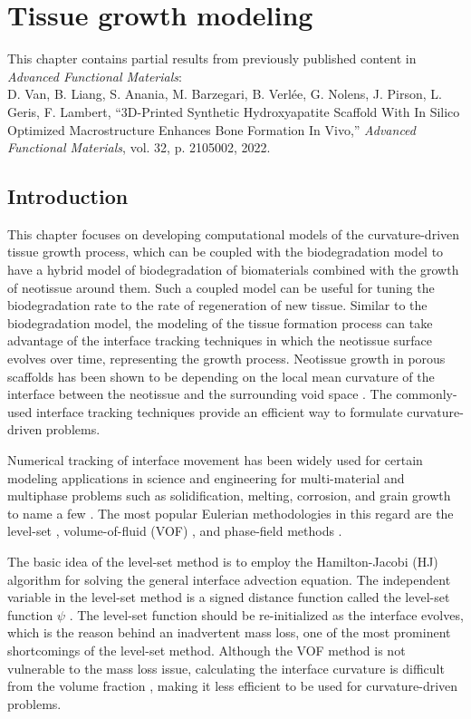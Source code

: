 \chapter{Tissue growth modeling}\label{ch:tissue}

\begin{shaded}
This chapter contains partial results from previously published content in \textit{Advanced Functional Materials}:\\
D. Van, B. Liang, S. Anania, M. Barzegari, B. Verlée, G. Nolens, J. Pirson, L. Geris, F. Lambert, ``3D-Printed Synthetic Hydroxyapatite Scaffold With In Silico Optimized Macrostructure Enhances Bone Formation In Vivo,'' \textit{Advanced Functional Materials}, vol. 32, p. 2105002, 2022.
\end{shaded}


\section{Introduction}

This chapter focuses on developing computational models of the curvature-driven tissue growth process, which can be coupled with the biodegradation model to have a hybrid model of biodegradation of biomaterials combined with the growth of neotissue around them. Such a coupled model can be useful for tuning the biodegradation rate to the rate of regeneration of new tissue. Similar to the biodegradation model, the modeling of the tissue formation process can take advantage of the interface tracking techniques in which the neotissue surface evolves over time, representing the growth process. Neotissue growth in porous scaffolds has been shown to be depending on the local mean curvature of the interface between the neotissue and the surrounding void space \cite{Bidan2012, Bidan2012a, Rumpler2008}. The commonly-used interface tracking techniques provide an efficient way to formulate curvature-driven problems. 

Numerical tracking of interface movement has been widely used for certain modeling applications in science and engineering for multi-material and multiphase problems such as solidification, melting, corrosion, and grain growth to name a few \cite{Sun2007}. The most popular Eulerian methodologies in this regard are the level-set \cite{Osher1988,Andrew2000,RonaldFedkiw2002}, volume-of-fluid (VOF) \cite{Rider1998}, and phase-field methods \cite{Boettinger2002,Bellemans2017}. 


The basic idea of the level-set method is to employ the Hamilton-Jacobi (HJ) algorithm for solving the general interface advection equation. The independent variable in the level-set method is a signed distance function called the level-set function $\psi$ \cite{RonaldFedkiw2002}. The level-set function should be re-initialized as the interface evolves, which is the reason behind an inadvertent mass loss, one of the most prominent shortcomings of the level-set method. Although the VOF method is not vulnerable to the mass loss issue, calculating the interface curvature is difficult from the volume fraction \cite{Sun2007}, making it less efficient to be used for curvature-driven problems. 

